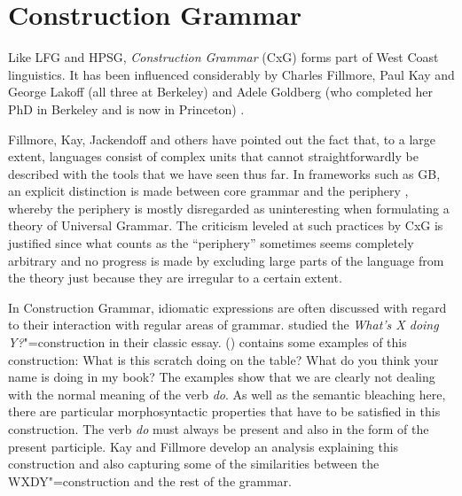 \chapter{Construction Grammar}
\label{Kapitel-CxG}\label{chap-cxg}

%
%
%
%


Like LFG and HPSG, \emph{Construction Grammar} (CxG) forms part of West Coast linguistics.
It has been influenced considerably by Charles Fillmore, Paul Kay and George Lakoff (all three at Berkeley) and Adele Goldberg
(who completed her PhD in Berkeley and is now in Princeton)
\citep*{Fillmore88a,FKoC88a,KF99a,Kay2002a,Kay2005a,Goldberg95a,Goldberg2006a}.

Fillmore, Kay, Jackendoff and others have pointed out the fact that, to a large extent, languages consist of complex units that cannot straightforwardly
be described with the tools that we have seen thus far. In frameworks such as GB, an explicit distinction is made between core grammar
and the periphery \citep[]{Chomsky81a}, whereby the periphery is mostly disregarded as uninteresting when formulating a theory
of Universal Grammar. The criticism leveled at such practices by CxG is justified since what counts as the ``periphery'' sometimes seems completely
arbitrary \citep{MuellerKernigkeit} and no progress is made by excluding large parts of the language
from the theory just because they are irregular to a certain extent.

In Construction Grammar, idiomatic expressions are often discussed with regard to their interaction
with regular areas of grammar. \citet{KF99a} studied the \emph{What's X doing Y?}"=construction in
their classic essay. () contains some examples of this construction: 
\eal
\ex What is this scratch doing on the table?
\ex What do you think your name is doing in my book?
\zl
The examples show that we are clearly not dealing with the normal meaning of the verb \emph{do}. As well as the semantic bleaching here,
there are particular morphosyntactic properties that have to be satisfied in this construction. The verb \emph{do} must always be present
and also in the form of the present participle. Kay and Fillmore develop an analysis explaining this construction and also capturing some
of the similarities between the WXDY"=construction and the rest of the grammar.

